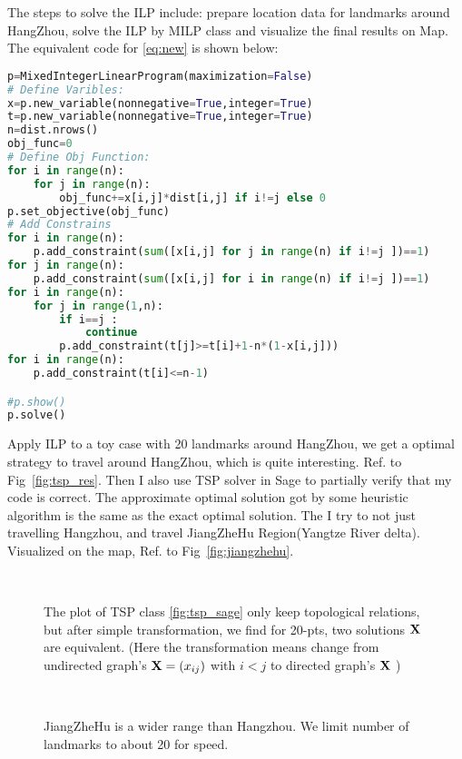 \documentclass{mcmthesis}
\begin{document}
The steps to solve the ILP include: prepare location data for landmarks around HangZhou, solve the ILP by MILP class and visualize the final results on Map. The equivalent code for \eqref{eq:new} is shown below:

\begin{lstlisting}[language=Python]
p=MixedIntegerLinearProgram(maximization=False) 
# Define Varibles:
x=p.new_variable(nonnegative=True,integer=True)
t=p.new_variable(nonnegative=True,integer=True)
n=dist.nrows()
obj_func=0
# Define Obj Function:
for i in range(n):
	for j in range(n):
		obj_func+=x[i,j]*dist[i,j] if i!=j else 0
p.set_objective(obj_func)
# Add Constrains
for i in range(n):
	p.add_constraint(sum([x[i,j] for j in range(n) if i!=j ])==1)
for j in range(n):
	p.add_constraint(sum([x[i,j] for i in range(n) if i!=j ])==1)
for i in range(n):
	for j in range(1,n):
		if i==j :
			continue
		p.add_constraint(t[j]>=t[i]+1-n*(1-x[i,j]))
for i in range(n):
	p.add_constraint(t[i]<=n-1)

#p.show()
p.solve()
\end{lstlisting}

Apply ILP to a toy case with 20 landmarks around HangZhou, we get a optimal strategy to travel around HangZhou, which is quite interesting. Ref. to Fig~\vref{fig:tsp_res}. Then I also use TSP solver in Sage to partially verify that my code is correct. The approximate optimal solution got by some heuristic algorithm is the same as the exact optimal solution. The I try to not just travelling Hangzhou, and travel JiangZheHu Region(Yangtze River delta). Visualized on the map, Ref. to Fig~\vref{fig:jiangzhehu}. 

\begin{figure}
	\centering
	 \quad  
	\\
	  \quad 
	\caption[Results]{The plot  of  TSP class \vref{fig:tsp_sage} only keep topological relations, but after simple transformation, we find for 20-pts, two solutions $\mathbf{X}$ are equivalent. (Here the transformation means change from undirected graph's $\mathbf{X}=(x_{ij})$ with $i < j$  to directed graph's $\mathbf{X}$ ) } 
\end{figure}
\begin{figure}
	\centering
	 \   
	\caption[Results]{JiangZheHu is a wider range than Hangzhou. We limit number of landmarks to about 20 for speed.} 
\end{figure}
\end{document}
